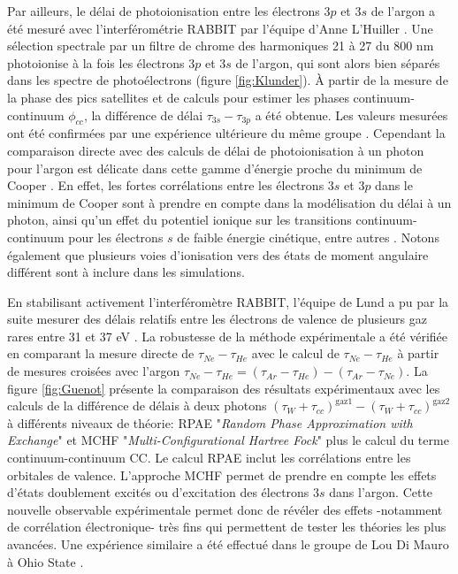 Par ailleurs, le délai de photoionisation entre les électrons $3p$ et $3s$ de l'argon a été mesuré avec l'interférométrie RABBIT par l'équipe d'Anne L'Huiller . Une sélection spectrale par un filtre de chrome des harmoniques 21 à 27 du 800 nm photoionise à la fois les électrons $3p$ et $3s$ de l'argon, qui sont alors bien séparés dans les spectre de photoélectrons (figure \ref{fig:Klunder}). \`A partir de la mesure de la phase des pics satellites et de calculs pour estimer les phases continuum-continuum $\phi_{cc}$, la différence de délai $\tau_{3s} - \tau_{3p}$ a été obtenue. Les valeurs mesurées ont été confirmées par une expérience ultérieure du même groupe . Cependant la comparaison directe avec des calculs de délai de photoionisation à un photon pour l'argon est délicate dans cette gamme d'énergie proche du minimum de Cooper . En effet, les fortes corrélations entre les électrons $3s$ et $3p$ dans le minimum de Cooper sont à prendre en compte dans la modélisation du délai à un photon, ainsi qu'un effet du potentiel ionique sur les transitions continuum-continuum pour les électrons $s$ de faible énergie cinétique, entre autres . Notons également que plusieurs voies d'ionisation vers des états de moment angulaire différent sont à inclure dans les simulations.

En stabilisant activement l'interféromètre RABBIT, l'équipe de Lund a pu par la suite mesurer des délais relatifs entre les électrons de valence de plusieurs gaz rares entre 31 et 37 eV . La robustesse de la méthode expérimentale a été vérifiée en comparant la mesure directe de  $\tau_{Ne} - \tau_{He}$ avec le calcul de $\tau_{Ne} - \tau_{He}$ à partir de mesures croisées avec l'argon $\tau_{Ne} - \tau_{He} = (\tau_{Ar} - \tau_{He}) - (\tau_{Ar} - \tau_{Ne})$. La figure \ref{fig:Guenot} présente la comparaison des résultats expérimentaux avec les calculs de la différence de délais à deux photons $(\tau_W + \tau_{cc})^{\mathrm{gaz} 1} - (\tau_W + \tau_{cc})^{\mathrm{gaz} 2}$ à différents niveaux de théorie: RPAE "\textit{Random Phase Approximation with Exchange}"  et MCHF "\textit{Multi-Configurational Hartree Fock}"  plus le calcul du terme continuum-continuum CC. Le calcul RPAE inclut les corrélations entre les orbitales de valence. L'approche MCHF permet de prendre en compte les effets d'états doublement excités ou d'excitation des électrons $3s$ dans l'argon. Cette nouvelle observable expérimentale permet donc de révéler des effets -notamment de corrélation électronique- très fins qui permettent de tester les théories les plus avancées. Une expérience similaire a été effectué dans le groupe de Lou Di Mauro à Ohio State .

